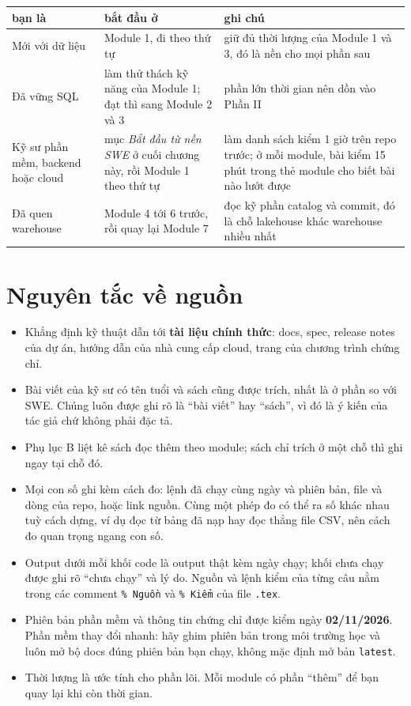 \documentclass[11pt,a4paper,oneside]{report}
\newcommand{\thd}[1]{\textbf{\sffamily\small #1}}
\newcommand{\code}[1]{\texttt{#1}}
\begin{document}
\begin{xltabular}{\textwidth}{@{}P{3.4cm} L L@{}}
\toprule
\thd{bạn là} & \thd{bắt đầu ở} & \thd{ghi chú} \\
\midrule
\endhead
\bottomrule
\endfoot
Mới với dữ liệu & Module 1, đi theo thứ tự & giữ đủ thời lượng của Module 1 và 3, đó là nền cho mọi phần sau \\
Đã vững SQL & làm thử thách kỹ năng của Module 1; đạt thì sang Module 2 và 3 & phần lớn thời gian nên dồn vào Phần II \\
Kỹ sư phần mềm, backend hoặc cloud & mục \textit{Bắt đầu từ nền SWE} ở cuối chương này, rồi Module 1 theo thứ tự & làm danh sách kiểm 1 giờ trên repo trước; ở mỗi module, bài kiểm 15 phút trong thẻ module cho biết bài nào lướt được \\
Đã quen warehouse & Module 4 tới 6 trước, rồi quay lại Module 7 & đọc kỹ phần catalog và commit, đó là chỗ lakehouse khác warehouse nhiều nhất \\
\end{xltabular}

\section{Nguyên tắc về nguồn}
\begin{itemize}
  \item Khẳng định kỹ thuật dẫn tới \textbf{tài liệu chính thức}: docs, spec, release notes của dự án, hướng dẫn của nhà cung cấp cloud, trang của chương trình chứng chỉ.
  \item Bài viết của kỹ sư có tên tuổi và sách cũng được trích, nhất là ở phần so với SWE. Chúng luôn được ghi rõ là ``bài viết'' hay ``sách'', vì đó là ý kiến của tác giả chứ không phải đặc tả.
  \item Phụ lục B liệt kê sách đọc thêm theo module; sách chỉ trích ở một chỗ thì ghi ngay tại chỗ đó.
  \item Mọi con số ghi kèm cách đo: lệnh đã chạy cùng ngày và phiên bản, file và dòng của repo, hoặc link nguồn. Cùng một phép đo có thể ra số khác nhau tuỳ cách dựng, ví dụ đọc từ bảng đã nạp hay đọc thẳng file CSV, nên cách đo quan trọng ngang con số.
  \item Output dưới mỗi khối code là output thật kèm ngày chạy; khối chưa chạy được ghi rõ ``chưa chạy'' và lý do. Nguồn và lệnh kiểm của từng câu nằm trong các comment \code{\% Nguồn} và \code{\% Kiểm} của file \code{.tex}.
  \item Phiên bản phần mềm và thông tin chứng chỉ được kiểm ngày \textbf{02/11/2026}. Phần mềm thay đổi nhanh: hãy ghim phiên bản trong môi trường học và luôn mở bộ docs đúng phiên bản bạn chạy, không mặc định mở bản \code{latest}.
  \item Thời lượng là ước tính cho phần lõi. Mỗi module có phần ``thêm'' để bạn quay lại khi còn thời gian.
\end{itemize}
\end{document}
